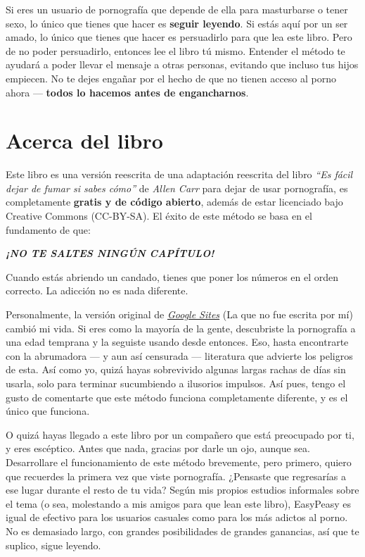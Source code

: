 \documentclass[
  openany]{book}
\let\oldhref\href
\renewcommand{\href}[2]{\textcolor{blue}{\oldhref{#1}{#2}}}
\begin{document}
Si eres un usuario de pornografía que depende de ella para masturbarse o tener sexo, lo único que tienes que hacer es \textbf{seguir leyendo}. Si estás aquí por un ser amado, lo único que tienes que hacer es persuadirlo para que lea este libro. Pero de no poder persuadirlo, entonces lee el libro tú mismo. Entender el método te ayudará a poder llevar el mensaje a otras personas, evitando que incluso tus hijos empiecen. No te dejes engañar por el hecho de que no tienen acceso al porno ahora --- \textbf{todos lo hacemos antes de engancharnos}.

\hypertarget{acerca-del-libro}{%
\section*{Acerca del libro}\label{acerca-del-libro}}

Este libro es una versión reescrita de una adaptación reescrita del libro \emph{``Es fácil dejar de fumar si sabes cómo''} de \emph{Allen Carr} para dejar de usar pornografía, es completamente \textbf{gratis y de código abierto}, además de estar licenciado bajo Creative Commons (CC-BY-SA). El éxito de este método se basa en el fundamento de que:

{\emph{\textbf{¡NO TE SALTES NINGÚN CAPÍTULO!}}}

Cuando estás abriendo un candado, tienes que poner los números en el orden correcto. La adicción no es nada diferente.

Personalmente, la versión original de \href{https://sites.google.com/site/sites/system/errors/WebspaceNotFound?path=\%2Fhackbookeasypeasy}{\emph{Google Sites}} (La que no fue escrita por mí) cambió mi vida. Si eres como la mayoría de la gente, descubriste la pornografía a una edad temprana y la seguiste usando desde entonces. Eso, hasta encontrarte con la abrumadora --- y aun así censurada --- literatura que advierte los peligros de esta. Así como yo, quizá hayas sobrevivido algunas largas rachas de días sin usarla, solo para terminar sucumbiendo a ilusorios impulsos. Así pues, tengo el gusto de comentarte que este método funciona completamente diferente, y es el único que funciona.

O quizá hayas llegado a este libro por un compañero que está preocupado por ti, y eres escéptico. Antes que nada, gracias por darle un ojo, aunque sea. Desarrollare el funcionamiento de este método brevemente, pero primero, quiero que recuerdes la primera vez que viste pornografía. ¿Pensaste que regresarías a ese lugar durante el resto de tu vida? Según mis propios estudios informales sobre el tema (o sea, molestando a mis amigos para que lean este libro), EasyPeasy es igual de efectivo para los usuarios casuales como para los más adictos al porno. No es demasiado largo, con grandes posibilidades de grandes ganancias, así que te suplico, sigue leyendo.
\end{document}
